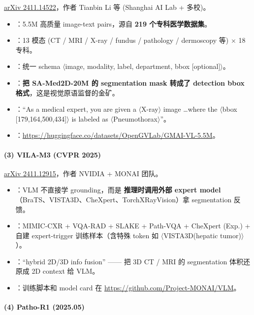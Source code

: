\href{https://arxiv.org/abs/2411.14522}{arXiv 2411.14522}，作者 Tianbin Li 等 (Shanghai AI Lab + 多校)。

\begin{itemize}[leftmargin=1.5em]
  \item {}：5.5M 高质量 image-text pairs，源自 \textbf{219 个专科医学数据集}。
  \item {}：13 模态 (CT / MRI / X-ray / fundus / pathology / dermoscopy 等) $\times$ 18 专科。
  \item {}：统一 schema $\langle$image, modality, label, department, bbox [optional]$\rangle$。
  \item {}：\textbf{把 SA-Med2D-20M 的 segmentation mask 转成了 detection bbox 格式}，这是视觉原语监督的金矿。
  \item {}：``As a medical expert, you are given a $\langle$X-ray$\rangle$ image \dots where the $\langle$bbox [179,164,500,434]$\rangle$ is labeled as $\langle$Pneumothorax$\rangle$''。
  \item {}：\url{https://huggingface.co/datasets/OpenGVLab/GMAI-VL-5.5M}。
\end{itemize}

\paragraph{(3) VILA-M3 (CVPR 2025)}

\href{https://arxiv.org/abs/2411.12915}{arXiv 2411.12915}，作者 NVIDIA + MONAI 团队。

\begin{itemize}[leftmargin=1.5em]
  \item {}：VLM 不直接学 grounding，而是 \textbf{推理时调用外部 expert model}（BraTS、VISTA3D、CheXpert、TorchXRayVision）拿 segmentation 反馈。
  \item {}：MIMIC-CXR + VQA-RAD + SLAKE + Path-VQA + CheXpert (Exp.) + 自建 expert-trigger 训练样本（含特殊 token 如 $\langle$VISTA3D(hepatic tumor)$\rangle$）。
  \item {}：``hybrid 2D/3D info fusion'' —— 把 3D CT / MRI 的 segmentation 体积还原成 2D context 给 VLM。
  \item {}：训练脚本和 model card 在 \url{https://github.com/Project-MONAI/VLM}。
\end{itemize}

\paragraph{(4) Patho-R1 (2025.05)}

